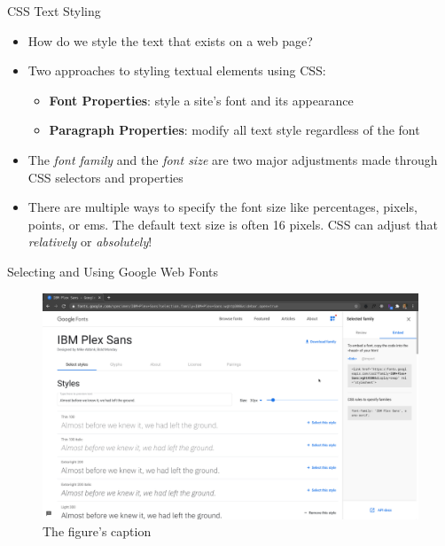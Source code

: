 \documentclass[14pt,aspectratio=169]{beamer}
\begin{document}
%
\begin{frame}{CSS Text Styling}
  \begin{itemize}
    \item How do we style the text that exists on a web page?
      \vspace*{-.2in}
    \item Two approaches to styling textual elements using CSS:
      \begin{itemize}
        \item {\bf Font Properties}: style a site's font and its appearance
        \item {\bf Paragraph Properties}: modify all text style regardless of
          the font
      \end{itemize}
      \vspace*{-.2in}
    \item The {\em font family} and the {\em font size} are two major
      adjustments made through CSS selectors and properties
      \vspace*{-.2in}
    \item There are multiple ways to specify the font size like percentages,
      pixels, points, or ems. The default text size is often 16 pixels. CSS can
      adjust that {\em relatively} or {\em absolutely}!
  \end{itemize}
\end{frame}

%
\begin{frame}{Selecting and Using Google Web Fonts}
  \begin{figure}
    \centering
    \includegraphics[scale=.085]{images/google-web-fonts.png}
    \caption{The figure's caption}
  \end{figure}
\end{frame}
\end{document}
